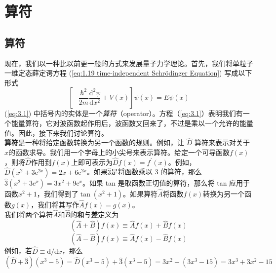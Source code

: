 \chapter{算符}
\section{算符}
	现在，我们以一种比以前更一般的方式来发展量子力学理论。首先，我们将单粒子一维定态薛定谔方程 (\ref{eq:1.19 time-independent Schrödinger Equation}) 写成以下形式
	\begin{equation}
		\left[-\frac{\hbar^2}{2m}\frac{\mathrm{d}^2\psi}{\mathrm{d}x^2}+V\left(x\right)\right]\psi\left(x\right) = E\psi\left(x\right)
		\label{eq:3.1}
	\end{equation}
	(\ref{eq:3.1}) 中括号内的实体是一个\textit{算符}（operator）。方程（\ref{eq:3.1}）表明我们有一个能量算符，它对波函数起作用后，波函数又回来了，不过是乘以一个允许的能量值。因此，接下来我们讨论算符。\\
	\indent \textbf{算符}是一种将给定函数转换为另一个函数的规则。例如，让 $\hat{D}$ 算符来表示对关于$x$的函数求导。我们用一个字母上的小尖号来表示算符。给定一个可导函数$f\left(x\right)$，则将$\hat{D}$作用到$f\left(x\right)$上即可表示为$\hat{D}f\left(x\right) = f^{\prime}\left(x\right)$。例如，$\hat{D}\left(x^2+3\mathrm{e}^{2x}\right) = 2x+6\mathrm{e}^{2x}$。如果$\hat{3}$是将函数乘以 3 的算符，那么$\hat{3}\left(x^2+3\mathrm{e}^x\right) = 3x^2+9\mathrm{e}^x$。如果 tan 是取函数正切值的算符，那么将 tan 应用于函数$x^2+1$，我们得到了$\tan\left(x^2+1\right)$。如果算符$\hat{A}$将函数$f\left(x\right)$转换为另一个函数$g\left(x\right)$，我们将其写作$\hat{A}f\left(x\right) = g\left(x\right)$。\\
	\indent 我们将两个算符$\hat{A}$和$\hat{B}$的\textbf{和}与\textbf{差}定义为
	\begin{equation}
		\boxed{
			\left(\hat{A}+\hat{B}\right)f\left(x\right) \equiv \hat{A}f\left(x\right)+\hat{B}f\left(x\right)
		}
		\label{eq:3.2 definition of operators' sum and differenct}
	\end{equation}
	\begin{equation*}
		\left(\hat{A}-\hat{B}\right)f\left(x\right) \equiv \hat{A}f\left(x\right)-\hat{B}f\left(x\right)
	\end{equation*}
	例如，若$\hat{D} \equiv \mathrm{d}/\mathrm{d}x$，那么
	\begin{equation*}
		\left(\hat{D}+\hat{3}\right)\left(x^3-5\right) = \hat{D}\left(x^3-5\right)+ \hat{3}\left(x^3-5\right) = 3x^2+\left(3x^3-15\right) = 3x^3+3x^2-15
	\end{equation*}
